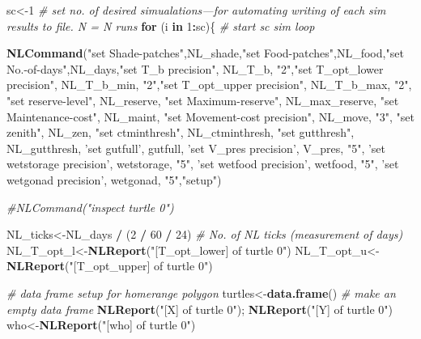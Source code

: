 \documentclass[]{article}
\newenvironment{Shaded}{\begin{snugshade}}{\end{snugshade}}
\newcommand{\KeywordTok}[1]{\textcolor[rgb]{0.13,0.29,0.53}{\textbf{#1}}}
\newcommand{\DecValTok}[1]{\textcolor[rgb]{0.00,0.00,0.81}{#1}}
\newcommand{\StringTok}[1]{\textcolor[rgb]{0.31,0.60,0.02}{#1}}
\newcommand{\CommentTok}[1]{\textcolor[rgb]{0.56,0.35,0.01}{\textit{#1}}}
\newcommand{\ControlFlowTok}[1]{\textcolor[rgb]{0.13,0.29,0.53}{\textbf{#1}}}
\newcommand{\OperatorTok}[1]{\textcolor[rgb]{0.81,0.36,0.00}{\textbf{#1}}}
\newcommand{\NormalTok}[1]{#1}
\begin{document}
\begin{Shaded}
\begin{Highlighting}[]
\NormalTok{sc<-}\DecValTok{1} \CommentTok{# set no. of desired simualations---for automating writing of each sim results to file. N = N runs}
\ControlFlowTok{for}\NormalTok{ (i }\ControlFlowTok{in} \DecValTok{1}\OperatorTok{:}\NormalTok{sc)\{ }\CommentTok{# start sc sim loop}

\KeywordTok{NLCommand}\NormalTok{(}\StringTok{"set Shade-patches"}\NormalTok{,NL_shade,}\StringTok{"set Food-patches"}\NormalTok{,NL_food,}\StringTok{"set No.-of-days"}\NormalTok{,NL_days,}\StringTok{"set T_b precision"}\NormalTok{,}
\NormalTok{NL_T_b, }\StringTok{"2"}\NormalTok{,}\StringTok{"set T_opt_lower precision"}\NormalTok{, NL_T_b_min, }\StringTok{"2"}\NormalTok{,}\StringTok{"set T_opt_upper precision"}\NormalTok{, NL_T_b_max, }\StringTok{"2"}\NormalTok{,}
\StringTok{"set reserve-level"}\NormalTok{, NL_reserve, }\StringTok{"set Maximum-reserve"}\NormalTok{, NL_max_reserve, }\StringTok{"set Maintenance-cost"}\NormalTok{, NL_maint,}
\StringTok{"set Movement-cost precision"}\NormalTok{, NL_move, }\StringTok{"3"}\NormalTok{, }\StringTok{"set zenith"}\NormalTok{, NL_zen, }\StringTok{"set ctminthresh"}\NormalTok{, NL_ctminthresh, }
\StringTok{"set gutthresh"}\NormalTok{, NL_gutthresh, }\StringTok{'set gutfull'}\NormalTok{, gutfull, }\StringTok{'set V_pres precision'}\NormalTok{, V_pres, }\StringTok{"5"}\NormalTok{, }\StringTok{'set wetstorage precision'}\NormalTok{, wetstorage, }\StringTok{"5"}\NormalTok{, }
\StringTok{'set wetfood precision'}\NormalTok{, wetfood, }\StringTok{"5"}\NormalTok{, }\StringTok{'set wetgonad precision'}\NormalTok{, wetgonad, }\StringTok{"5"}\NormalTok{,}\StringTok{"setup"}\NormalTok{)}

\CommentTok{#NLCommand("inspect turtle 0")}

\NormalTok{NL_ticks<-NL_days }\OperatorTok{/}\StringTok{ }\NormalTok{(}\DecValTok{2} \OperatorTok{/}\StringTok{ }\DecValTok{60} \OperatorTok{/}\StringTok{ }\DecValTok{24}\NormalTok{) }\CommentTok{# No. of NL ticks (measurement of days)}
\NormalTok{NL_T_opt_l<-}\KeywordTok{NLReport}\NormalTok{(}\StringTok{"[T_opt_lower] of turtle 0"}\NormalTok{)}
\NormalTok{NL_T_opt_u<-}\KeywordTok{NLReport}\NormalTok{(}\StringTok{"[T_opt_upper] of turtle 0"}\NormalTok{)}

\CommentTok{# data frame setup for homerange polygon}
\NormalTok{turtles<-}\KeywordTok{data.frame}\NormalTok{() }\CommentTok{# make an empty data frame}
\KeywordTok{NLReport}\NormalTok{(}\StringTok{"[X] of turtle 0"}\NormalTok{); }\KeywordTok{NLReport}\NormalTok{(}\StringTok{"[Y] of turtle 0"}\NormalTok{)}
\NormalTok{who<-}\KeywordTok{NLReport}\NormalTok{(}\StringTok{"[who] of turtle 0"}\NormalTok{)}


\end{Highlighting}
\end{Shaded}
\end{document}
